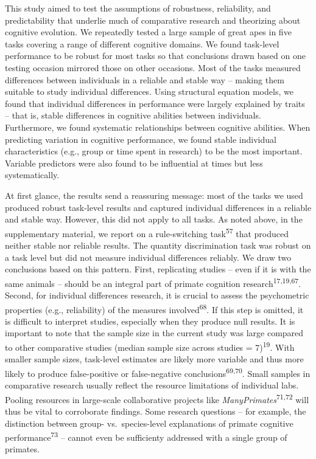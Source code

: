 \documentclass[
  man,floatsintext]{apa6}
\begin{document}
This study aimed to test the assumptions of robustness, reliability, and predictability that underlie much of comparative research and theorizing about cognitive evolution. We repeatedly tested a large sample of great apes in five tasks covering a range of different cognitive domains. We found task-level performance to be robust for most tasks so that conclusions drawn based on one testing occasion mirrored those on other occasions. Most of the tasks measured differences between individuals in a reliable and stable way -- making them suitable to study individual differences. Using structural equation models, we found that individual differences in performance were largely explained by traits -- that is, stable differences in cognitive abilities between individuals. Furthermore, we found systematic relationships between cognitive abilities. When predicting variation in cognitive performance, we found stable individual characteristics (e.g., group or time spent in research) to be the most important. Variable predictors were also found to be influential at times but less systematically.

At first glance, the results send a reassuring message: most of the tasks we used produced robust task-level results and captured individual differences in a reliable and stable way. However, this did not apply to all tasks. As noted above, in the supplementary material, we report on a rule-switching task\textsuperscript{57} that produced neither stable nor reliable results. The quantity discrimination task was robust on a task level but did not measure individual differences reliably. We draw two conclusions based on this pattern. First, replicating studies -- even if it is with the same animals -- should be an integral part of primate cognition research\textsuperscript{17,19,67}. Second, for individual differences research, it is crucial to assess the psychometric properties (e.g., reliability) of the measures involved\textsuperscript{68}. If this step is omitted, it is difficult to interpret studies, especially when they produce null results. It is important to note that the sample size in the current study was large compared to other comparative studies (median sample size across studies = 7)\textsuperscript{19}. With smaller sample sizes, task-level estimates are likely more variable and thus more likely to produce false-positive or false-negative conclusions\textsuperscript{69,70}. Small samples in comparative research usually reflect the resource limitations of individual labs. Pooling resources in large-scale collaborative projects like \emph{ManyPrimates}\textsuperscript{71,72} will thus be vital to corroborate findings. Some research questions -- for example, the distinction between group- vs.~species-level explanations of primate cognitive performance\textsuperscript{73} -- cannot even be sufficienty addressed with a single group of primates.
\end{document}
